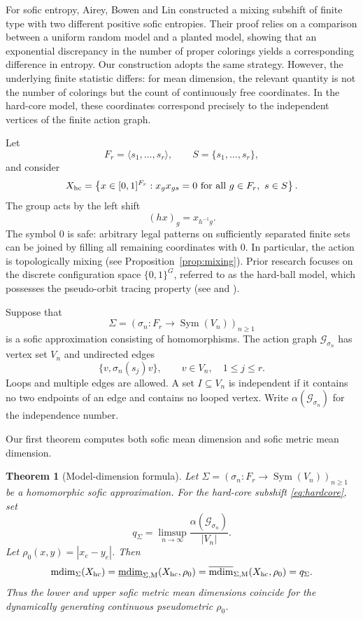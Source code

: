\documentclass[12pt,a4paper]{amsart}
\newtheorem{theorem}{Theorem}[section]
\theoremstyle{definition}
\newcommand{\mdim}{\operatorname{mdim}}
\newcommand{\Sym}{\operatorname{Sym}}
\newcommand{\ind}{\alpha}
\newcommand{\cG}{\mathcal G}
\begin{document}
	For sofic entropy, Airey, Bowen and Lin \cite{ABL22} constructed a mixing subshift of finite type with two different positive sofic entropies.  Their proof relies on a comparison between a uniform random model and a planted model, showing that an exponential discrepancy in the number of proper colorings yields a corresponding difference in entropy. Our construction adopts the same strategy. However, the underlying finite statistic differs: for mean dimension, the relevant quantity is not the number of colorings but the count of continuously free coordinates. In the hard-core model, these coordinates correspond precisely to the independent vertices of the finite action graph.
	
	Let
	\[
	F_r=\langle s_1,\ldots,s_r\rangle,
	\qquad S=\{s_1,\ldots,s_r\},
	\]
	and consider
	\begin{equation}\label{eq:hardcore}
		X_{\rm hc}=\left\{x\in[0,1]^{F_r}:x_gx_{gs}=0
		\text{ for all }g\in F_r,\ s\in S\right\}.
	\end{equation}
	The group acts by the left shift
	\[
	(hx)_g=x_{h^{-1}g}.
	\]
	The symbol $0$ is safe: arbitrary legal patterns on sufficiently separated finite sets can be joined by filling all remaining coordinates with $0$.  In particular, the action is topologically mixing (see Proposition~\ref{prop:mixing}). Prior research focuses on the discrete configuration space $\{0,1\}^G$, referred to as the hard-ball model, which possesses the pseudo-orbit tracing property (see \cite[Example 6.6]{BGL22} and \cite[Example 4.1]{CCL}).
	
	Suppose that
	\[
	\Sigma=(\sigma_n:F_r\to\Sym(V_n))_{n\ge 1}
	\]
	is a sofic approximation consisting of homomorphisms.  The action graph $\cG_{\sigma_n}$ has vertex set $V_n$ and undirected edges
	\[
	\{v,\sigma_n(s_j)v\},\qquad v\in V_n,\quad 1\le j\le r.
	\]
	Loops and multiple edges are allowed. 	A set $I\subseteq V_n$ is independent if it contains no two endpoints of an edge and contains no looped vertex.  Write $\ind(\cG_{\sigma_{n}})$ for the independence number.
	
	Our first theorem computes both sofic mean dimension and sofic metric mean dimension.
	
	\begin{theorem}[Model-dimension formula]\label{thm:model-formula}
		Let $\Sigma=(\sigma_n:F_r\to\Sym(V_n))_{n\ge 1}$ be a homomorphic sofic approximation.  For the hard-core subshift \eqref{eq:hardcore}, set
		\[
		q_\Sigma=\limsup_{n\to\infty}
		\frac{\ind(\cG_{\sigma_n})}{|V_n|}.
		\]
		Let $\rho_0(x,y)=|x_e-y_e|$.  Then
		\[
		\mdim_\Sigma(X_{\rm hc})
		=\underline{\mdim}_{\Sigma,\mathrm M}(X_{\rm hc},\rho_0)
		=\overline{\mdim}_{\Sigma,\mathrm M}(X_{\rm hc},\rho_0)
		=q_\Sigma.
		\]
		Thus the lower and upper sofic metric  mean dimensions coincide for the dynamically generating continuous pseudometric $\rho_0$.
	\end{theorem}
	
\end{document}
